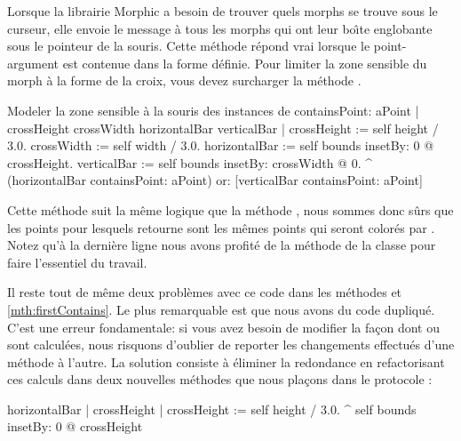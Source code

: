 \documentclass[a4paper,10pt,twoside]{book}
\begin{document}
Lorsque la librairie Morphic a besoin de trouver quels morphs se
trouve sous le curseur, elle envoie le message 
 \`a tous les morphs qui ont leur bo\^{\i}te englobante sous le
pointeur de la souris. 
Cette m\'ethode r\'epond vrai lorsque le point-argument est contenue dans la
forme d\'efinie.
Pour limiter la zone sensible du morph \`a la forme de la croix, vous
devez surcharger la m\'ethode .


\begin{method}[firstContains]{Modeler la zone sensible \`a la souris des instances de }
containsPoint: aPoint
	| crossHeight crossWidth horizontalBar verticalBar |
	crossHeight := self height / 3.0.
	crossWidth := self width / 3.0.
	horizontalBar := self bounds insetBy: 0 @ crossHeight.
	verticalBar := self bounds insetBy: crossWidth @ 0.
	^ (horizontalBar containsPoint: aPoint)
		or: [verticalBar containsPoint: aPoint]
\end{method}

Cette m\'ethode suit la m\^eme logique que la m\'ethode , 
nous sommes donc s\^urs que les points pour lesquels
 retourne  sont les m\^emes points qui
seront color\'es par .
Notez qu'\`a 
la derni\`ere ligne
nous avons profit\'e de la m\'ethode
de la classe  pour faire l'essentiel du travail.

Il reste tout de m\^eme deux probl\`emes avec ce code dans les m\'ethodes
 et \ref{mth:firstContains}.
Le plus remarquable est que nous avons du code dupliqu\'e.
C'est une erreur fondamentale: si vous avez besoin de modifier la
fa\c{c}on dont  ou  sont
calcul\'ees, nous risquons d'oublier de reporter les changements
effectu\'es d'une m\'ethode \`a l'autre.
La solution consiste \`a \'eliminer la redondance en refactorisant ces
calculs dans deux nouvelles m\'ethodes que nous pla\c{c}ons dans le
protocole :

\begin{method}{}
horizontalBar
	| crossHeight |
	crossHeight := self height / 3.0.
	^ self bounds insetBy: 0 @ crossHeight
\end{method}
\end{document}
